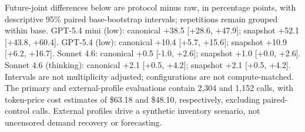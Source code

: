 Future-joint differences below are protocol minus raw, in percentage points, with descriptive 95\% paired base-bootstrap intervals; repetitions remain grouped within base.
GPT-5.4 mini (low): canonical +38.5 [+28.6, +47.9]; snapshot +52.1 [+43.8, +60.4].
GPT-5.4 (low): canonical +10.4 [+5.7, +15.6]; snapshot +10.9 [+6.2, +16.7].
Sonnet 4.6: canonical +0.5 [-1.0, +2.6]; snapshot +1.0 [+0.0, +2.6].
Sonnet 4.6 (thinking): canonical +2.1 [+0.5, +4.2]; snapshot +2.1 [+0.5, +4.2].
Intervals are not multiplicity adjusted; configurations are not compute-matched.
The primary and external-profile evaluations contain 2,304 and 1,152 calls, with token-price cost estimates of \$63.18 and \$48.10, respectively, excluding paired-control calls. External profiles drive a synthetic inventory scenario, not uncensored demand recovery or forecasting.
